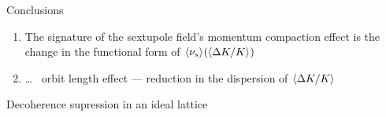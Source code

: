 \documentclass[14pt]{beamer}
\begin{document}
\begin{frame}{Conclusions}
	\begin{enumerate}[<+->]
		\item The signature of the sextupole field's momentum compaction effect is the change in the functional form of $\avg{\nu_s}(\avg{\Delta K/K})$
		\item \ldots~ orbit length effect --- reduction in the dispersion of $\avg{\Delta K/K}$
	\end{enumerate}
\end{frame}

\begin{frame}{Decoherence supression in an ideal lattice}\centering
\end{frame}
\end{document}
